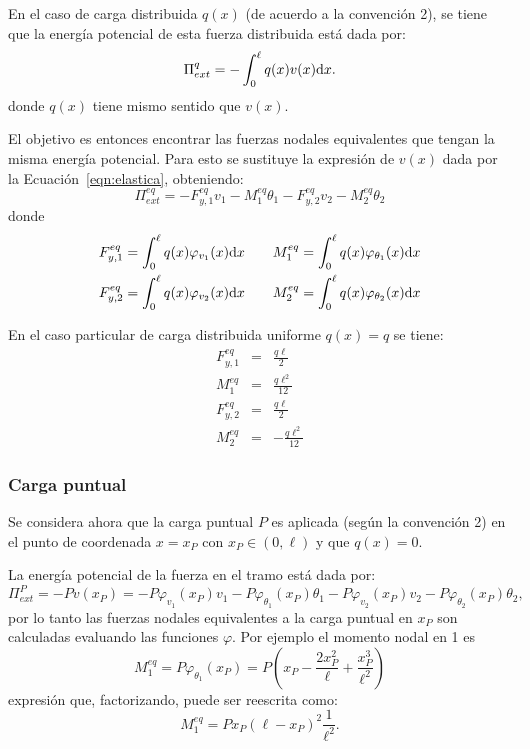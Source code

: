 En el caso de carga distribuida $q(x)$ (de acuerdo a la convención 2), se tiene que la energía potencial de esta fuerza distribuida está dada por:
%
\begin{equation}
	\Pi_{ext}^q =
	- \int_0^\ell q(x) v(x) {\text{d}} x.
\end{equation}
%
donde $q(x)$ tiene mismo sentido que $v(x)$.

El objetivo es entonces encontrar las fuerzas nodales equivalentes que tengan la misma energía potencial. Para esto se sustituye la expresión de $v(x)$ dada por la Ecuación~\eqref{eqn:elastica}, obteniendo:
%
\begin{equation}
	\Pi_{ext}^{eq} =
	-F_{y,1}^{eq} v_1 - M_1^{eq} \theta_1 -F_{y,2}^{eq} v_2 -  M_2^{eq} \theta_2
\end{equation}
donde
\begin{eqnarray}
	F_{y,1}^{eq} = \int_{0}^{\ell} q(x) \varphi_{v_1}(x) {\text{d}} x \qquad & \displaystyle M_1^{eq} = \int_{0}^{\ell}q(x) \varphi_{\theta_1}(x)  {\text{d}} x  \nonumber\\
	F_{y,2}^{eq} = \int_{0}^{\ell}q(x) \varphi_{v_2}(x)  {\text{d}} x \qquad & \displaystyle M_2^{eq} = \int_{0}^{\ell} q(x)\varphi_{\theta_2}(x)  {\text{d}} x  \nonumber
\end{eqnarray}

En el caso particular de carga distribuida uniforme $q(x) = q$ se tiene:
%
\begin{eqnarray}
	F_{y,1}^{eq} &=& \frac{q \ell}{2} \\
	M_1^{eq} &=& \frac{q \ell^{2}}{12} \\
	F_{y,2}^{eq} &=& \frac{q \ell}{2} \\
	M_2^{eq} &=& - \frac{q \ell^{2}}{12}
\end{eqnarray}

\subsubsection{Carga puntual}

Se considera ahora que la carga puntual $P$ es aplicada (según la convención 2) en el punto de coordenada $x= x_P$ con $x_P \in (0,\ell)$ y que $q(x)=0$.

La energía potencial de la fuerza en el tramo está dada por:
%
\begin{equation}
	\Pi_{ext}^{P} = - P v (x_P) =  -P \varphi_{v_1}(x_P) v_1 - P \varphi_{\theta_1}(x_P) \theta_1
	- P \varphi_{v_2}(x_P) v_2 - P \varphi_{\theta_2}(x_P) \theta_2,
\end{equation}
%
por lo tanto las fuerzas nodales equivalentes a la carga puntual en $x_P$ son calculadas evaluando las funciones $\varphi$. %
%
Por ejemplo el momento nodal en 1 es
%
\begin{equation}
	M_1^{eq} = P \varphi_{\theta_1} (x_P) = P  \left(x_P - \frac{2 x_P^{2}}{\ell} + \frac{x_P^{3}}{\ell^{2}}\right)
\end{equation}
%
expresión que, factorizando, puede ser reescrita como:
\begin{equation}
	M_1^{eq} = P x_P (\ell-x_P)^2 \frac{1}{\ell^2}.
\end{equation}

